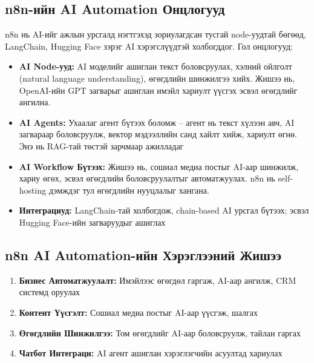 \documentclass[12pt,A4]{report}
\begin{document}
\subsection{n8n-ийн AI Automation Онцлогууд}

n8n нь AI-ийг ажлын урсгалд нэгтгэхэд зориулагдсан тусгай node-уудтай бөгөөд, LangChain, Hugging Face зэрэг AI хэрэгслүүдтэй холбогддог. Гол онцлогууд:

\begin{itemize}
    \item \textbf{AI Node-ууд:} AI моделийг ашиглан текст боловсруулах, хэлний ойлголт (natural language understanding), өгөгдлийн шинжилгээ хийх. Жишээ нь, OpenAI-ийн GPT загварыг ашиглан имэйл хариулт үүсгэх эсвэл өгөгдлийг ангилна. \cite{n8n3}
    \item \textbf{AI Agents:} Ухаалаг агент бүтээх боломж – агент нь текст хүлээн авч, AI загвараар боловсруулж, вектор мэдээллийн санд хайлт хийж, хариулт өгнө. Энэ нь RAG-тай төстэй зарчмаар ажилладаг
    \item \textbf{AI Workflow Бүтээх:} Жишээ нь, сошиал медиа постыг AI-аар шинжилж, хариу өгөх, эсвэл өгөгдлийн боловсруулалтыг автоматжуулах. n8n нь self-hosting дэмждэг тул өгөгдлийн нууцлалыг хангана. \cite{n8n2}
    \item \textbf{Интеграциуд:} LangChain-тай холбогдож, chain-based AI урсгал бүтээх; эсвэл Hugging Face-ийн загваруудыг ашиглах
\end{itemize}

\subsection{n8n AI Automation-ийн Хэрэглээний Жишээ}

\begin{enumerate}
    \item \textbf{Бизнес Автоматжуулалт:} Имэйлээс өгөгдөл гаргаж, AI-аар ангилж, CRM системд оруулах
    \item \textbf{Контент Үүсгэлт:} Сошиал медиа постыг AI-аар үүсгэж, шалгах
    \item \textbf{Өгөгдлийн Шинжилгээ:} Том өгөгдлийг AI-аар боловсруулж, тайлан гаргах
    \item \textbf{Чатбот Интеграци:} AI агент ашиглан хэрэглэгчийн асуултад хариулах
\end{enumerate}
\end{document}
